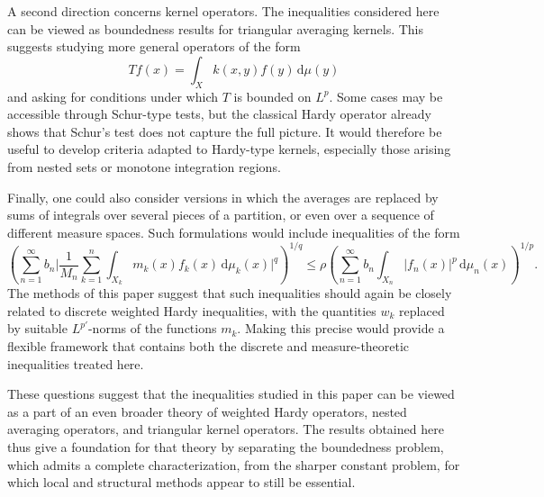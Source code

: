 \documentclass[oneside,10pt]{article}          %
\numberwithin{equation}{section}
\begin{document}
A second direction concerns kernel operators. The inequalities considered here can be viewed as boundedness results for triangular averaging kernels. This suggests studying more general operators of the form 
\[ 
Tf(x)=\int_X k(x,y)f(y)\,\mathrm{d}\mu(y) 
\] 
and asking for conditions under which $T$ is bounded on $L^p$. Some cases may be accessible through Schur-type tests, but the classical Hardy operator already shows that Schur's test does not capture the full picture. It would therefore be useful to develop criteria adapted to Hardy-type kernels, especially those arising from nested sets or monotone integration regions. 

Finally, one could also consider versions in which the averages are replaced by sums of integrals over several pieces of a partition, or even over a sequence of different measure spaces. Such formulations would include inequalities of the form 
\[ 
\left(\sum_{n=1}^{\infty} b_n \bigg| \frac{1}{M_n} \sum_{k=1}^{n} \int_{X_k} m_k(x)f_k(x)\,\mathrm{d}\mu_k(x) \bigg|^q\right)^{\!\!1/q}\! \leq \rho \left( \sum_{n=1}^{\infty} b_n \int_{X_n}|f_n(x)|^p\,\mathrm{d}\mu_n(x) \right)^{\!\!1/p}. 
\] 
The methods of this paper suggest that such inequalities should again be closely related to discrete weighted Hardy inequalities, with the quantities $w_k$ replaced by suitable $L^{p'}$-norms of the functions $m_k$. Making this precise would provide a flexible framework that contains both the discrete and measure-theoretic inequalities treated here. 

These questions suggest that the inequalities studied in this paper can be viewed as a part of an even broader theory of weighted Hardy operators, nested averaging operators, and triangular kernel operators. The results obtained here thus give a foundation for that theory by separating the boundedness problem, which admits a complete characterization, from the sharper constant problem, for which local and structural methods appear to still be essential.




\end{document}
